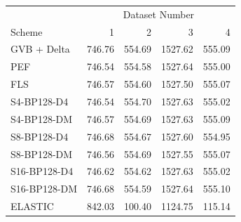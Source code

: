 \begin{tabular}{lrrrr}
\toprule
 & \multicolumn{4}{c}{Dataset Number} \\
Scheme & 1 & 2 & 3 & 4 \\
\midrule
GVB + Delta & 746.76 & 554.69 & 1527.62 & 555.09 \\
PEF & 746.54 & 554.58 & 1527.64 & 555.00 \\
FLS & 746.57 & 554.60 & 1527.50 & 555.07 \\
S4-BP128-D4 & 746.54 & 554.70 & 1527.63 & 555.02 \\
S4-BP128-DM & 746.57 & 554.69 & 1527.63 & 555.09 \\
S8-BP128-D4 & 746.68 & 554.67 & 1527.60 & 554.95 \\
S8-BP128-DM & 746.56 & 554.69 & 1527.55 & 555.07 \\
S16-BP128-D4 & 746.62 & 554.62 & 1527.63 & 555.02 \\
S16-BP128-DM & 746.68 & 554.59 & 1527.64 & 555.10 \\
ELASTIC & 842.03 & 100.40 & 1124.75 & 115.14 \\
\bottomrule
\end{tabular}
